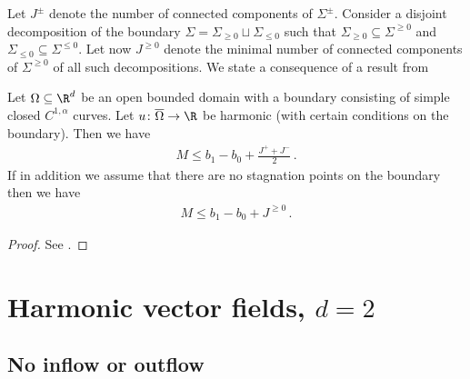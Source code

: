 Let $J^\pm$ denote the number of connected components of $\Sigma^\pm$.
Consider a disjoint decomposition of the boundary $\Sigma=\Sigma_{\geq0}\sqcup\Sigma_{\leq0}$ such
that $\Sigma_{\geq0}\subseteq\Sigma^{\geq0}$ and $\Sigma_{\leq0}\subseteq\Sigma^{\leq0}$.
Let now $J^{\geq0}$ denote the minimal number of connected components of $\Sigma^{\geq0}$ of all such
decompositions.
We state a consequence of a result from \cite[Theorem 2.1]{Alessandrini1992}
\begin{proposition} 
  Let $\Omega\subseteq\R^d$ be an open bounded domain with a boundary consisting of simple closed $C^{1,\alpha}$ curves.
  Let $u\colon \overline{\Omega}\to \R$ be harmonic (with certain conditions on the boundary).
  Then we have
  \begin{align*}
    M\leq b_1-b_0+\frac{J^++J^-}{2}\,.
  \end{align*}
  If in addition we assume that there are no stagnation points on the boundary then we have
  \begin{align*}
    M\leq b_1-b_0+J^{\geq0}\,.
  \end{align*}
\end{proposition}
\begin{proof}
  See \cite[Theorem 2.1]{Alessandrini1992}.
\end{proof}

\newpage

\chapter{Harmonic vector fields, $d=2$}


\section{No inflow or outflow}

